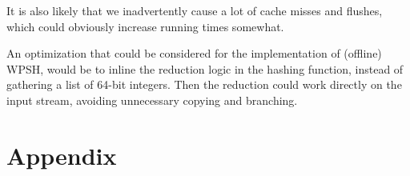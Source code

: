 \documentclass[]{article}
\newcommand{\funk}[1]{\small\texttt{#1}}
\newcommand{\includecode}[2][C]{}
\begin{document}
It is also likely that we inadvertently cause a lot of cache misses and flushes, which could obviously increase running times somewhat.

An optimization that could be considered for the implementation of (offline) WPSH, would be to inline the reduction logic in the hashing function, instead of gathering a list of 64-bit integers. Then the reduction could work directly on the input stream, avoiding unnecessary copying and branching.


\section{Appendix}
\lstlistoflistings
\newpage
\includecode{hashing/hotbox.cpp}
\newpage
\includecode{hashing/std.ipp}
\includecode{hashing/dshash.ipp}
\end{document}
